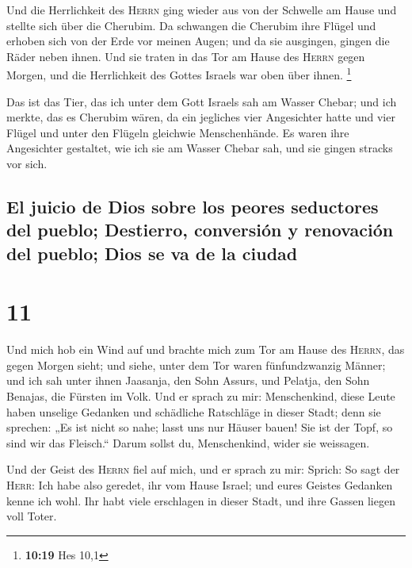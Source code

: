  Und die Herrlichkeit des \textsc{Herrn} ging wieder aus
von der Schwelle am Hause und stellte sich über die Cherubim.
 Da schwangen die Cherubim ihre Flügel und erhoben sich
von der Erde vor meinen Augen; und da sie ausgingen, gingen die Räder
neben ihnen. Und sie traten in das Tor am Hause des \textsc{Herrn} gegen
Morgen, und die Herrlichkeit des Gottes Israels war oben über ihnen.
\footnote{\textbf{10:19} Hes 10,1}

 Das ist das Tier, das ich unter dem Gott Israels sah am
Wasser Chebar; und ich merkte, das es Cherubim wären,  da
ein jegliches vier Angesichter hatte und vier Flügel und unter den
Flügeln gleichwie Menschenhände.  Es waren ihre
Angesichter gestaltet, wie ich sie am Wasser Chebar sah, und sie gingen
stracks vor sich.

\hypertarget{el-juicio-de-dios-sobre-los-peores-seductores-del-pueblo-destierro-conversiuxf3n-y-renovaciuxf3n-del-pueblo-dios-se-va-de-la-ciudad}{%
\subsection{El juicio de Dios sobre los peores seductores del pueblo;
Destierro, conversión y renovación del pueblo; Dios se va de la
ciudad}\label{el-juicio-de-dios-sobre-los-peores-seductores-del-pueblo-destierro-conversiuxf3n-y-renovaciuxf3n-del-pueblo-dios-se-va-de-la-ciudad}}

\hypertarget{section-10}{%
\section{11}\label{section-10}}

 Und mich hob ein Wind auf und brachte mich zum Tor am
Hause des \textsc{Herrn}, das gegen Morgen sieht; und siehe, unter dem
Tor waren fünfundzwanzig Männer; und ich sah unter ihnen Jaasanja, den
Sohn Assurs, und Pelatja, den Sohn Benajas, die Fürsten im Volk.
 Und er sprach zu mir: Menschenkind, diese Leute haben
unselige Gedanken und schädliche Ratschläge in dieser Stadt;
 denn sie sprechen: „Es ist nicht so nahe; lasst uns nur
Häuser bauen! Sie ist der Topf, so sind wir das Fleisch.``
 Darum sollst du, Menschenkind, wider sie weissagen.

 Und der Geist des \textsc{Herrn} fiel auf mich, und er
sprach zu mir: Sprich: So sagt der \textsc{Herr}: Ich habe also geredet,
ihr vom Hause Israel; und eures Geistes Gedanken kenne ich wohl.
 Ihr habt viele erschlagen in dieser Stadt, und ihre
Gassen liegen voll Toter.

